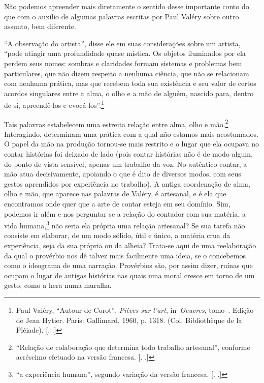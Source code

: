 Não podemos apreender mais diretamente o sentido desse importante conto
do que com o auxílio de algumas palavras escritas por Paul Valéry sobre
outro assunto, bem diferente.

``A observação do artista'', disse ele em suas considerações sobre um
artista, ``pode atingir uma profundidade quase mística. Os objetos
iluminados por ela perdem seus nomes: sombras e claridades formam
sistemas e problemas bem particulares, que não dizem respeito a nenhuma
ciência, que não se relacionam com nenhuma prática, mas que recebem toda
sua existência e seu valor de certos acordos singulares entre a alma, o
olho e a mão de alguém, nascido para, dentro de si, apreendê-los e
evocá-los''.\footnote{Paul Valéry, ``Autour de Corot'', \emph{Pièces sur
  l'art}, in~\emph{Oeuvres}, tomo~. Edição de Jean Hytier. Paris:
  Gallimard, 1960, p. 1318. (Col. Bibliothèque de la Pléiade). [. .]}

Tais palavras estabelecem uma estreita relação entre alma, olho e
mão.\footnote{``Relação de colaboração que determina todo trabalho
  artesanal'', conforme acréscimo efetuado na versão francesa. [. 
  .]} Interagindo, determinam uma prática com a qual não estamos mais
acostumados. O papel da mão na produção tornou-se mais restrito e o
lugar que ela ocupava no contar histórias foi deixado de lado (pois
contar histórias não é de modo algum, do ponto de vista sensível, apenas
um trabalho da voz. No autêntico contar, a mão atua decisivamente,
apoiando o que é dito de diversos modos, com seus gestos aprendidos por
experiência no trabalho). A antiga coordenação de alma, olho e mão, que
aparece nas palavras de Valéry, é artesanal, e é ela que encontramos
onde quer que a arte de contar esteja em seu domínio. Sim, podemos ir
além e nos perguntar se a relação do contador com sua matéria, a vida
humana,\footnote{``a experiência humana'', segundo variação da versão
  francesa. [. .]} não seria ela própria uma relação
artesanal? Se sua tarefa não consiste em elaborar, de um modo sólido,
útil e único, a matéria crua da experiência, seja da sua própria ou da
alheia? Trata-se aqui de uma reelaboração da qual o provérbio nos dê
talvez mais facilmente uma ideia, se o concebemos como o ideograma de
uma narração. Provérbios são, por assim dizer, ruínas que ocupam o lugar
de antigas histórias nas quais uma moral cresce em torno de um gesto,
como a hera numa muralha.

